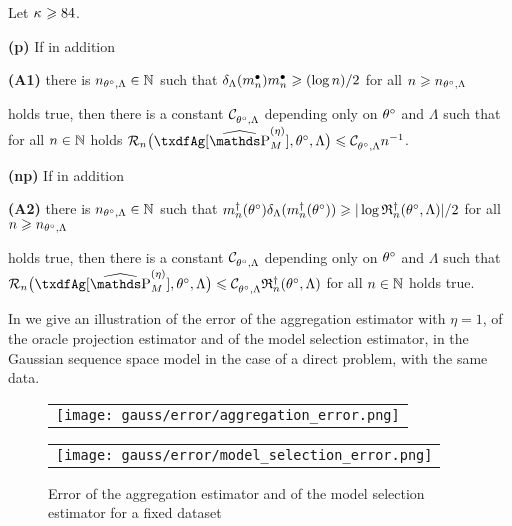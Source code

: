 \begin{cor}
  Let $\cpen \geq 84$.
  \begin{Liste}[]
  \item[{\dgrau\bfseries{(p)}}]
    If in addition
    \begin{inparaenum}\item[{{\dgrau\bfseries(A1)}}]
      there is
      $\ssY_{\xdf,\Lambda}\in\Nz$ such that
      $\cmiSv[\sDi{\ssY}]\sDi{\ssY}\geq (\log\ssY)/2$ for all
      $\ssY\geq \ssY_{\xdf,\Lambda}$
    \end{inparaenum}
    holds true, then there is a constant $\cst{\xdf,\Lambda}$ depending
    only on $\xdf$ and $\Lambda$ such that for all $n\in\Nz$ holds
    $\nRi{\txdfAg[{\erWe[]}]}{\xdf,\Lambda} \leq
    \cst{\xdf,\Lambda}\ssY^{-1}$.
  \item[{\dgrau\bfseries{(np)}}]
    If in addition
    \begin{inparaenum}\item[{{\dgrau\bfseries(A2)}}]
      there is  $\ssY_{\xdf,\Lambda}\in\Nz$ such that
      $\aDi{\ssY}(\xdf)\cmSv[\aDi{\ssY}(\xdf)]\geq \vert \log\naRa{(\xdf,\Lambda)} \vert/2 $
      for all $\ssY\geq \ssY_{\xdf,\Lambda}$
    \end{inparaenum}
    holds true, then there is a constant $\cst{\xdf,\Lambda}$ depending
    only on $\xdf$ and $\Lambda$ such that $\nRi{\txdfAg[{\erWe[]}]}{\xdf,\Lambda}
    \leq \cst{\xdf,\Lambda}\naRa{(\xdf,\Lambda)}$ for all $n\in\Nz$ holds true.
  \end{Liste} 
    \reEnd 
\end{cor}

In  we give an illustration of the error of the aggregation estimator with $\eta = 1$, of the oracle projection estimator and of the model selection estimator, in the Gaussian sequence space model in the case of a direct problem, with the same data.

\begin{figure}
  \centering
  \begin{tabular}{@{}c@{}}
    \texttt{[image: gauss/error/aggregation\_error.png]} \\[\abovecaptionskip]
  \end{tabular}
  \begin{tabular}{@{}c@{}}
    \texttt{[image: gauss/error/model\_selection\_error.png]} \\[\abovecaptionskip]
  \end{tabular}
  \caption{Error of the aggregation estimator and of the model selection estimator for a fixed dataset}
  \label{fig:freq:igssm:error}
\end{figure}


